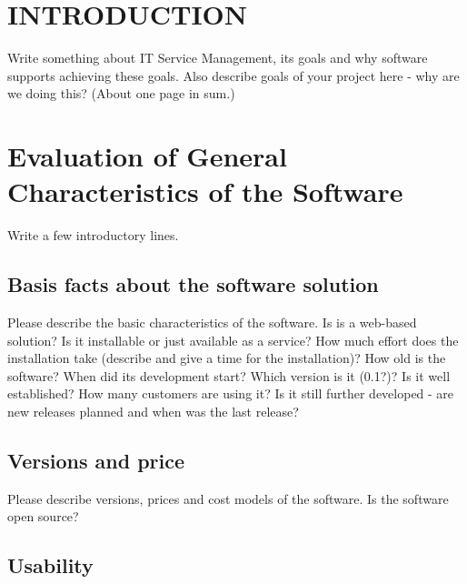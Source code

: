 
\renewcommand{\baselinestretch}{1.2}\normalsize

\chapter{INTRODUCTION}
\label{sec:introduction}

\setcounter{footnote}{1}

Write something about IT Service Management, its goals and why software supports achieving these goals. Also describe goals of your project here - why are we doing this? (About one page in sum.)

\chapter{Evaluation of General Characteristics of the Software}

Write a few introductory lines.

\section{Basis facts about the software solution}

Please describe the basic characteristics of the software. Is is a web-based solution? Is it installable or just available as a service? How much effort does the installation take (describe and give a time for the installation)? How old is the software? When did its development start? Which version is it (0.1?)? Is it well established? How many customers are using it? Is it still further developed - are new releases planned and when was the last release? 



\section{Versions and price}

Please describe versions, prices and cost models of the software. Is the software open source?


\section{Usability}

